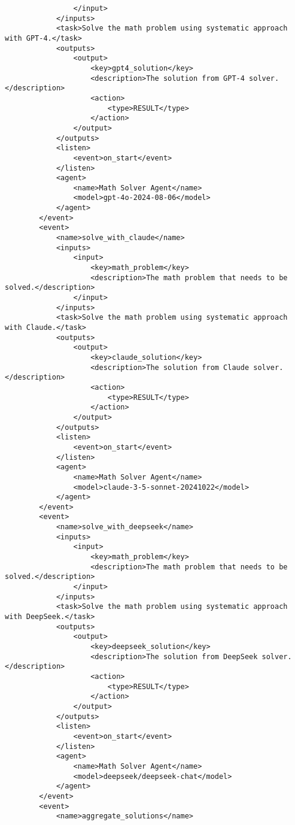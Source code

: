 \begin{lstlisting}
                </input>
            </inputs>
            <task>Solve the math problem using systematic approach with GPT-4.</task>
            <outputs>
                <output>
                    <key>gpt4_solution</key>
                    <description>The solution from GPT-4 solver.</description>
                    <action>
                        <type>RESULT</type>
                    </action>
                </output>
            </outputs>
            <listen>
                <event>on_start</event>
            </listen>
            <agent>
                <name>Math Solver Agent</name>
                <model>gpt-4o-2024-08-06</model>
            </agent>
        </event>
        <event>
            <name>solve_with_claude</name>
            <inputs>
                <input>
                    <key>math_problem</key>
                    <description>The math problem that needs to be solved.</description>
                </input>
            </inputs>
            <task>Solve the math problem using systematic approach with Claude.</task>
            <outputs>
                <output>
                    <key>claude_solution</key>
                    <description>The solution from Claude solver.</description>
                    <action>
                        <type>RESULT</type>
                    </action>
                </output>
            </outputs>
            <listen>
                <event>on_start</event>
            </listen>
            <agent>
                <name>Math Solver Agent</name>
                <model>claude-3-5-sonnet-20241022</model>
            </agent>
        </event>
        <event>
            <name>solve_with_deepseek</name>
            <inputs>
                <input>
                    <key>math_problem</key>
                    <description>The math problem that needs to be solved.</description>
                </input>
            </inputs>
            <task>Solve the math problem using systematic approach with DeepSeek.</task>
            <outputs>
                <output>
                    <key>deepseek_solution</key>
                    <description>The solution from DeepSeek solver.</description>
                    <action>
                        <type>RESULT</type>
                    </action>
                </output>
            </outputs>
            <listen>
                <event>on_start</event>
            </listen>
            <agent>
                <name>Math Solver Agent</name>
                <model>deepseek/deepseek-chat</model>
            </agent>
        </event>
        <event>
            <name>aggregate_solutions</name>

\end{lstlisting}
